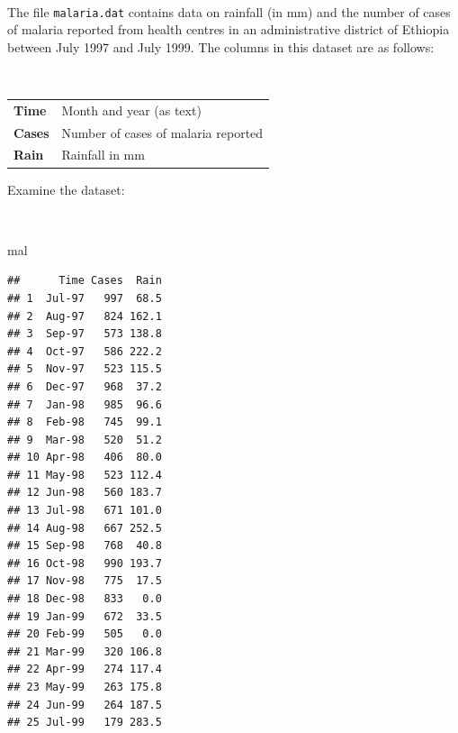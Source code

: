 \documentclass[12pt,a4paper]{book}
\newenvironment{Shaded}{\begin{snugshade}}{\end{snugshade}}
\newcommand{\NormalTok}[1]{#1}
\theoremstyle{definition}
\theoremstyle{definition}
\theoremstyle{definition}
\theoremstyle{remark}
\begin{document}
~

The file \texttt{malaria.dat} contains data on rainfall (in mm) and the
number of cases of malaria reported from health centres in an
administrative district of Ethiopia between July 1997 and July 1999. The
columns in this dataset are as follows:

~

\begin{longtable}[]{@{}ll@{}}
\toprule
\endhead
\begin{minipage}[t]{0.14\columnwidth}\raggedright
\textbf{Time}\strut
\end{minipage} & \begin{minipage}[t]{0.54\columnwidth}\raggedright
Month and year (as text)\strut
\end{minipage}\tabularnewline
\begin{minipage}[t]{0.14\columnwidth}\raggedright
\textbf{Cases}\strut
\end{minipage} & \begin{minipage}[t]{0.54\columnwidth}\raggedright
Number of cases of malaria reported\strut
\end{minipage}\tabularnewline
\begin{minipage}[t]{0.14\columnwidth}\raggedright
\textbf{Rain}\strut
\end{minipage} & \begin{minipage}[t]{0.54\columnwidth}\raggedright
Rainfall in mm\strut
\end{minipage}\tabularnewline
\bottomrule
\end{longtable}

\newpage

Examine the dataset:

~

\begin{Shaded}
\begin{Highlighting}[]
\NormalTok{mal}
\end{Highlighting}
\end{Shaded}

\begin{verbatim}
##      Time Cases  Rain
## 1  Jul-97   997  68.5
## 2  Aug-97   824 162.1
## 3  Sep-97   573 138.8
## 4  Oct-97   586 222.2
## 5  Nov-97   523 115.5
## 6  Dec-97   968  37.2
## 7  Jan-98   985  96.6
## 8  Feb-98   745  99.1
## 9  Mar-98   520  51.2
## 10 Apr-98   406  80.0
## 11 May-98   523 112.4
## 12 Jun-98   560 183.7
## 13 Jul-98   671 101.0
## 14 Aug-98   667 252.5
## 15 Sep-98   768  40.8
## 16 Oct-98   990 193.7
## 17 Nov-98   775  17.5
## 18 Dec-98   833   0.0
## 19 Jan-99   672  33.5
## 20 Feb-99   505   0.0
## 21 Mar-99   320 106.8
## 22 Apr-99   274 117.4
## 23 May-99   263 175.8
## 24 Jun-99   264 187.5
## 25 Jul-99   179 283.5
\end{verbatim}
\end{document}
